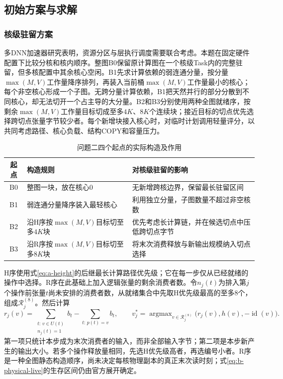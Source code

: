 \subsection{初始方案与求解}
\subsubsection{核级驻留方案}
多DNN加速器研究表明，资源分区与层执行调度需要联合考虑\cite{kwon2021heterogeneous}。本题在固定硬件配置下比较分核和核内顺序。整图B0保留原计算图在一个核级Task内的完整驻留，但多核配置中其余核心空闲。B1先求计算依赖的弱连通分量，按分量$\max(M,V)$工作量降序排列，再装入当前桶$\max(M,V)$工作量最小的核心；每个非空核心形成一个子图。无跨分量计算依赖，B1把天然并行的部分分散到不同核心，却无法切开一个占主导的大分量。B2和B3分别使用两种全图就绪序，按剩余$\max(M,V)$工作量目标切成至多$4K$、$8K$个连续块；接近目标的切点优先选择跨切点张量字节较少者。每个新增块接入核心时，对临时计划调用轻量评分，以共同考虑路径、核心负载、结构COPY和容量压力。

\begin{table}[H]\centering\caption{问题二四个起点的实际构造及作用}\label{tab:b-seeds}
\begin{tabularx}{\linewidth}{cYY}\toprule
起点 & 构造规则 & 对核级驻留的影响\\\midrule
B0 & 整图一块，放在核心0 & 无新增跨核边界，保留最长驻留区间\\
B1 & 弱连通分量降序装入最轻核心 & 利用独立分量，子图数量不超过非空核数\\
B2 & 沿H序按$\max(M,V)$目标切至多$4K$块 & 优先考虑长计算链，并在候选切点中压低跨切点字节\\
B3 & 沿R序按$\max(M,V)$目标切至多$8K$块 & 将末次消费释放与新输出规模纳入切点选择\\\bottomrule
\end{tabularx}\end{table}

H序使用式\eqref{eq:a-height}的后继最长计算路径优先级；它在每一步仅从已经就绪的操作中选择。R序在此基础上加入逻辑张量的剩余消费者数。令$n_j(t)$为排入第$j$个操作前张量$t$尚未安排的消费者数，从就绪集合中先取H优先级最高的至多8个，组成$\mathcal R_j^{(8)}$。然后计算
\begin{equation}
r_j(v)=\sum_{\substack{t:\,v\in U(t)\\n_j(t)=1}}b_t
-\sum_{t:\,p(t)=v}b_t,
\qquad v_j^*=\mathop{\arg\max}_{v\in\mathcal R_j^{(8)}}
\bigl(r_j(v),h(v),-\operatorname{id}(v)\bigr).
\label{eq:b-r-order}
\end{equation}
第一项只统计本步成为末次消费者的输入，而非全部输入字节；第二项是本步新产生的输出大小。若多个操作释放量相同，先选H优先级高者，再选编号小者。R序是一种全图静态构造顺序，尚未决定每核物理副本的真正末次读时刻；式\eqref{eq:b-physical-live}的生存区间仍由官方展开确定。

